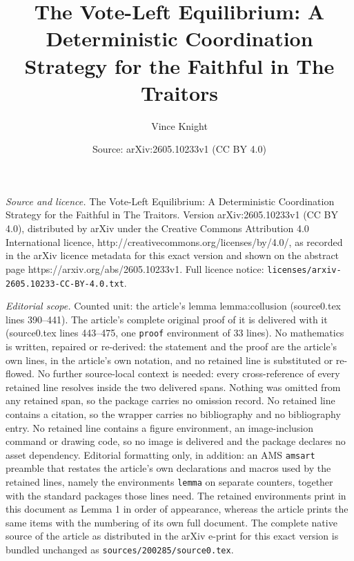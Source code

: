 \documentclass[10pt,a4paper]{amsart}
\title{The Vote-Left Equilibrium: A Deterministic Coordination Strategy for the Faithful in The Traitors}
\author{Vince Knight}
\date{Source: arXiv:2605.10233v1 (CC BY 4.0)}
\begin{document}
\maketitle

\noindent\emph{Source and licence.} The Vote-Left Equilibrium: A Deterministic Coordination Strategy for the Faithful in The Traitors. Version arXiv:2605.10233v1 (CC BY 4.0), distributed by arXiv under the Creative Commons Attribution 4.0 International licence, http://creativecommons.org/licenses/by/4.0/, as recorded in the arXiv licence metadata for this exact version and shown on the abstract page https://arxiv.org/abs/2605.10233v1. Full licence notice: \texttt{licenses/arxiv-2605.10233-CC-BY-4.0.txt}.\par\smallskip

\noindent\textit{Editorial scope.} Counted unit: the article's lemma lemma:collusion (source0.tex lines 390--441). The article's complete original proof of it is delivered with it (source0.tex lines 443--475, one \texttt{proof} environment of 33 lines). No mathematics is written, repaired or re-derived: the statement and the proof are the article's own lines, in the article's own notation, and no retained line is substituted or re-flowed.  No further source-local context is needed: every cross-reference of every retained line resolves inside the two delivered spans.  Nothing was omitted from any retained span, so the package carries no omission record.  No retained line contains a citation, so the wrapper carries no bibliography and no bibliography entry.  No retained line contains a figure environment, an image-inclusion command or drawing code, so no image is delivered and the package declares no asset dependency.  Editorial formatting only, in addition: an AMS \texttt{amsart} preamble that restates the article's own declarations and macros used by the retained lines, namely the environments \texttt{lemma} on separate counters, together with the standard packages those lines need.  The retained environments print in this document as Lemma 1 in order of appearance, whereas the article prints the same items with the numbering of its own full document.  The complete native source of the article as distributed in the arXiv e-print for this exact version is bundled unchanged as \texttt{sources/200285/source0.tex}.
\end{document}
